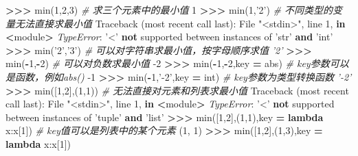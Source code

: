 \documentclass[]{ctexbook}
\newenvironment{Shaded}{\begin{snugshade}}{\end{snugshade}}
\newcommand{\BuiltInTok}[1]{#1}
\newcommand{\CommentTok}[1]{\textcolor[rgb]{0.56,0.35,0.01}{\textit{#1}}}
\newcommand{\DecValTok}[1]{\textcolor[rgb]{0.00,0.00,0.81}{#1}}
\newcommand{\KeywordTok}[1]{\textcolor[rgb]{0.13,0.29,0.53}{\textbf{#1}}}
\newcommand{\NormalTok}[1]{#1}
\newcommand{\OperatorTok}[1]{\textcolor[rgb]{0.81,0.36,0.00}{\textbf{#1}}}
\newcommand{\PreprocessorTok}[1]{\textcolor[rgb]{0.56,0.35,0.01}{\textit{#1}}}
\newcommand{\StringTok}[1]{\textcolor[rgb]{0.31,0.60,0.02}{#1}}
\begin{document}
\begin{Shaded}
\begin{Highlighting}[]
\OperatorTok{>>>} \BuiltInTok{min}\NormalTok{(}\DecValTok{1}\NormalTok{,}\DecValTok{2}\NormalTok{,}\DecValTok{3}\NormalTok{)  }\CommentTok{# 求三个元素中的最小值}
\DecValTok{1}
\OperatorTok{>>>} \BuiltInTok{min}\NormalTok{(}\DecValTok{1}\NormalTok{,}\StringTok{'2'}\NormalTok{) }\CommentTok{# 不同类型的变量无法直接求最小值}
\NormalTok{Traceback (most recent call last):}
\NormalTok{  File }\StringTok{"<stdin>"}\NormalTok{, line }\DecValTok{1}\NormalTok{, }\KeywordTok{in} \OperatorTok{<}\NormalTok{module}\OperatorTok{>}
\PreprocessorTok{TypeError}\NormalTok{: }\StringTok{'<'} \KeywordTok{not}\NormalTok{ supported between instances of }\StringTok{'str'} \KeywordTok{and} \StringTok{'int'}
\OperatorTok{>>>} \BuiltInTok{min}\NormalTok{(}\StringTok{'2'}\NormalTok{,}\StringTok{'3'}\NormalTok{) }\CommentTok{# 可以对字符串求最小值，按字母顺序求值}
\CommentTok{'2'}
\OperatorTok{>>>} \BuiltInTok{min}\NormalTok{(}\OperatorTok{-}\DecValTok{1}\NormalTok{,}\OperatorTok{-}\DecValTok{2}\NormalTok{) }\CommentTok{# 可以对负数求最小值}
\DecValTok{-2}
\OperatorTok{>>>} \BuiltInTok{min}\NormalTok{(}\OperatorTok{-}\DecValTok{1}\NormalTok{,}\OperatorTok{-}\DecValTok{2}\NormalTok{,key }\OperatorTok{=} \BuiltInTok{abs}\NormalTok{) }\CommentTok{# key参数可以是函数，例如abs()}
\DecValTok{-1}
\OperatorTok{>>>} \BuiltInTok{min}\NormalTok{(}\OperatorTok{-}\DecValTok{1}\NormalTok{,}\StringTok{'-2'}\NormalTok{,key }\OperatorTok{=} \BuiltInTok{int}\NormalTok{) }\CommentTok{# key参数为类型转换函数}
\CommentTok{'-2'}
\OperatorTok{>>>} \BuiltInTok{min}\NormalTok{([}\DecValTok{1}\NormalTok{,}\DecValTok{2}\NormalTok{],(}\DecValTok{1}\NormalTok{,}\DecValTok{1}\NormalTok{)) }\CommentTok{# 无法直接对元素和列表求最小值}
\NormalTok{Traceback (most recent call last):}
\NormalTok{  File }\StringTok{"<stdin>"}\NormalTok{, line }\DecValTok{1}\NormalTok{, }\KeywordTok{in} \OperatorTok{<}\NormalTok{module}\OperatorTok{>}
\PreprocessorTok{TypeError}\NormalTok{: }\StringTok{'<'} \KeywordTok{not}\NormalTok{ supported between instances of }\StringTok{'tuple'} \KeywordTok{and} \StringTok{'list'}
\OperatorTok{>>>} \BuiltInTok{min}\NormalTok{([}\DecValTok{1}\NormalTok{,}\DecValTok{2}\NormalTok{],(}\DecValTok{1}\NormalTok{,}\DecValTok{1}\NormalTok{),key }\OperatorTok{=} \KeywordTok{lambda}\NormalTok{ x:x[}\DecValTok{1}\NormalTok{]) }\CommentTok{# key值可以是列表中的某个元素}
\NormalTok{(}\DecValTok{1}\NormalTok{, }\DecValTok{1}\NormalTok{)}
\OperatorTok{>>>} \BuiltInTok{min}\NormalTok{([}\DecValTok{1}\NormalTok{,}\DecValTok{2}\NormalTok{],(}\DecValTok{1}\NormalTok{,}\DecValTok{3}\NormalTok{),key }\OperatorTok{=} \KeywordTok{lambda}\NormalTok{ x:x[}\DecValTok{1}\NormalTok{])}

\end{Highlighting}
\end{Shaded}
\end{document}
